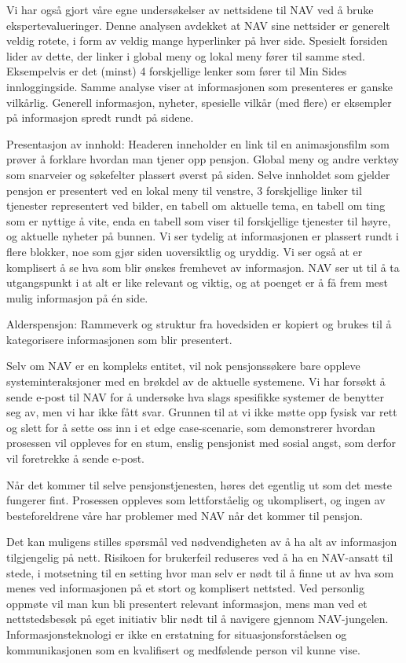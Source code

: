 \documentclass[informationsecurity]{gucmasterproject}
\begin{document}
Vi har også gjort våre egne undersøkelser av nettsidene til NAV ved å bruke ekspertevalueringer. Denne analysen avdekket at NAV sine nettsider er generelt veldig rotete, i form av veldig mange hyperlinker på hver side. Spesielt forsiden lider av dette, der linker i global meny og lokal meny fører til samme sted. Eksempelvis er det (minst) 4 forskjellige lenker som fører til Min Sides innloggingside. Samme analyse viser at informasjonen som presenteres er ganske vilkårlig. Generell informasjon, nyheter, spesielle vilkår (med flere) er eksempler på informasjon spredt rundt på sidene.

Presentasjon av innhold:
Headeren inneholder en link til en animasjonsfilm som prøver å forklare hvordan man tjener opp pensjon. Global meny og andre verktøy som snarveier og søkefelter plassert øverst på siden. Selve innholdet som gjelder pensjon er presentert ved en lokal meny til venstre, 3 forskjellige linker til tjenester representert ved bilder, en tabell om aktuelle tema, en tabell om ting som er nyttige å vite, enda en tabell som viser til forskjellige tjenester til høyre, og aktuelle nyheter på bunnen.
Vi ser tydelig at informasjonen er plassert rundt i flere blokker, noe som gjør siden uoversiktlig og uryddig. Vi ser også at er komplisert å se hva som blir ønskes fremhevet av informasjon. NAV ser ut til å ta utgangspunkt i at alt er like relevant og viktig, og at poenget er å få frem mest mulig informasjon på én side. 

Alderspensjon:
Rammeverk og struktur fra hovedsiden er kopiert og brukes til å kategorisere informasjonen som blir presentert.  

Selv om NAV er en kompleks entitet, vil nok pensjonssøkere bare oppleve systeminteraksjoner med en brøkdel av de aktuelle systemene. Vi har forsøkt å sende e-post til NAV for å undersøke hva slags spesifikke systemer de benytter seg av, men vi har ikke fått svar. Grunnen til at vi ikke møtte opp fysisk var rett og slett for å sette oss inn i et edge case-scenarie, som demonstrerer hvordan prosessen vil oppleves for en stum, enslig pensjonist med sosial angst, som derfor vil foretrekke å sende e-post.

Når det kommer til selve pensjonstjenesten, høres det egentlig ut som det meste fungerer fint. Prosessen oppleves som lettforståelig og ukomplisert, og ingen av besteforeldrene våre har problemer med NAV når det kommer til pensjon. 

Det kan muligens stilles spørsmål ved nødvendigheten av å ha alt av informasjon tilgjengelig på nett. Risikoen for brukerfeil reduseres ved å ha en NAV-ansatt til stede, i motsetning til en setting hvor man selv er nødt til å finne ut av hva som menes ved informasjonen på et stort og komplisert nettsted. Ved personlig oppmøte vil man kun bli presentert relevant informasjon, mens man ved et nettstedsbesøk på eget initiativ blir nødt til å navigere gjennom NAV-jungelen. Informasjonsteknologi er ikke en erstatning for situasjonsforståelsen og kommunikasjonen som en kvalifisert og medfølende person vil kunne vise.
\end{document}
